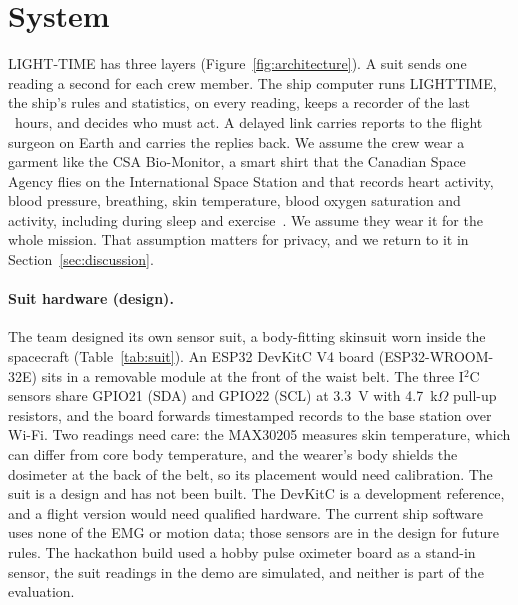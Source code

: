 \section{System}\label{sec:system}



LIGHT-TIME has three layers (Figure~\ref{fig:architecture}). A suit sends one reading a second for each crew member. The ship computer runs LIGHTTIME, the ship's rules and statistics, on every reading, keeps a recorder of the last \numRecorderHours~hours, and decides who must act. A delayed link carries reports to the flight surgeon on Earth and carries the replies back. We assume the crew wear a garment like the CSA Bio-Monitor, a smart shirt that the Canadian Space Agency flies on the International Space Station and that records heart activity, blood pressure, breathing, skin temperature, blood oxygen saturation and activity, including during sleep and exercise~\cite{csaBioMonitor}. We assume they wear it for the whole mission. That assumption matters for privacy, and we return to it in Section~\ref{sec:discussion}.

\paragraph{Suit hardware (design).}
The team designed its own sensor suit, a body-fitting skinsuit worn inside the spacecraft (Table~\ref{tab:suit}). An ESP32 DevKitC V4 board (ESP32-WROOM-32E) sits in a removable module at the front of the waist belt. The three I$^2$C sensors share GPIO21 (SDA) and GPIO22 (SCL) at 3.3~V with 4.7~k$\Omega$ pull-up resistors, and the board forwards timestamped records to the base station over Wi-Fi. Two readings need care: the MAX30205 measures skin temperature, which can differ from core body temperature, and the wearer's body shields the dosimeter at the back of the belt, so its placement would need calibration. The suit is a design and has not been built. The DevKitC is a development reference, and a flight version would need qualified hardware. The current ship software uses none of the EMG or motion data; those sensors are in the design for future rules. The hackathon build used a hobby pulse oximeter board as a stand-in sensor, the suit readings in the demo are simulated, and neither is part of the evaluation.

